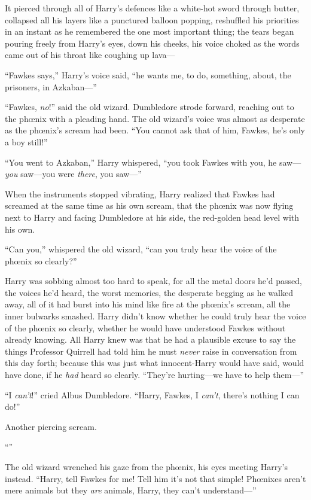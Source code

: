 It pierced through all of Harry’s defences like a white-hot sword through butter, collapsed all his layers like a punctured balloon popping, reshuffled his priorities in an instant as he remembered the one most important thing; the tears began pouring freely from Harry’s eyes, down his cheeks, his voice choked as the words came out of his throat like coughing up lava—

“Fawkes says,” Harry’s voice said, “he wants me, to do, something, about, the prisoners, in Azkaban—”

“Fawkes, \emph{no}!” said the old wizard. Dumbledore strode forward, reaching out to the phœnix with a pleading hand. The old wizard’s voice was almost as desperate as the phœnix’s scream had been. “You cannot ask that of him, Fawkes, he’s only a boy still!”

“You went to Azkaban,” Harry whispered, “you took Fawkes with you, he saw—\emph{you} saw—you were \emph{there}, you saw—”

When the instruments stopped vibrating, Harry realized that Fawkes had screamed at the same time as his own scream, that the phœnix was now flying next to Harry and facing Dumbledore at his side, the red-golden head level with his own.

“Can you,” whispered the old wizard, “can you truly hear the voice of the phœnix so clearly?”

Harry was sobbing almost too hard to speak, for all the metal doors he’d passed, the voices he’d heard, the worst memories, the desperate begging as he walked away, all of it had burst into his mind like fire at the phœnix’s scream, all the inner bulwarks smashed. Harry didn’t know whether he could truly hear the voice of the phœnix so clearly, whether he would have understood Fawkes without already knowing. All Harry knew was that he had a plausible excuse to say the things Professor Quirrell had told him he must \emph{never} raise in conversation from this day forth; because this was just what innocent-Harry would have said, would have done, if he \emph{had} heard so clearly. “They’re hurting—we have to help them—”

“I \emph{can’t}!” cried Albus Dumbledore. “Harry, Fawkes, I \emph{can’t}, there’s nothing I can do!”

Another piercing scream.

“”

The old wizard wrenched his gaze from the phœnix, his eyes meeting Harry’s instead. “Harry, tell Fawkes for me! Tell him it’s not that simple! Phœnixes aren’t mere animals but they \emph{are} animals, Harry, they can’t understand—”

